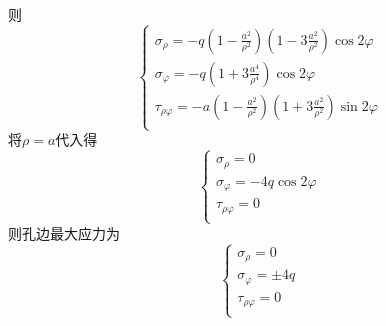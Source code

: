 \begin{remark}
则\[\begin{cases}
\sigma _{\rho}=-q\left( 1-\frac{a^2}{\rho ^2} \right) \left( 1-3\frac{a^2}{\rho ^2} \right) \cos 2\varphi\\
\sigma _{\varphi}=-q\left( 1+3\frac{a^4}{\rho ^4} \right) \cos 2\varphi\\
\tau _{\rho \varphi}=-a\left( 1-\frac{a^2}{\rho ^2} \right) \left( 1+3\frac{a^2}{\rho ^2} \right) \sin 2\varphi\\
\end{cases}\]
将$\rho =a$代入得\[\begin{cases}
\sigma _{\rho}=0\\
\sigma _{\varphi}=-4q\cos 2\varphi\\
\tau _{\rho \varphi}=0\\
\end{cases}\]
则孔边最大应力为\[\begin{cases}
\sigma _{\rho}=0\\
\sigma _{\varphi}=\pm 4q\\
\tau _{\rho \varphi}=0\\
\end{cases}\]
\end{remark}

